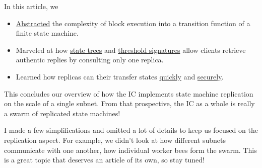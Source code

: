 \documentclass{article}
\begin{document}
In this article, we
\begin{itemize}
\item \href{#state-machine}{Abstracted} the complexity of block execution into a transition function of a finite state machine.
\item Marveled at how \href{#state-trees}{state trees} and \href{https://en.wikipedia.org/wiki/Threshold_cryptosystem}{threshold signatures} allow clients retrieve authentic replies by consulting only one replica.
\item Learned how replicas can their transfer states \href{#incremental-sync}{quickly} and \href{#trigger-transfer}{securely}.
\end{itemize}

This concludes our overview of how the IC implements state machine replication on the scale of a single subnet.
From that prospective, the IC as a whole is really a swarm of replicated state machines!

I made a few simplifications and omitted a lot of details to keep us focused on the replication aspect.
For example, we didn't look at how different subnets communicate with one another, how individual worker bees form the swarm.
This is a great topic that deserves an article of its own, so stay tuned!
\end{document}
